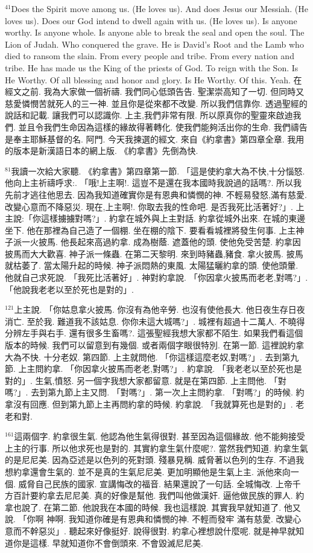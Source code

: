 \documentclass{book}
\begin{document}
$^{41}$Does the Spirit move among us.
(He loves us).
And does Jesus our Messiah.
(He loves us).
Does our God intend to dwell again with us.
(He loves us).
Is anyone worthy.
Is anyone whole.
Is anyone able to break the seal and open the soul.
The Lion of Judah.
Who conquered the grave.
He is David's Root and the Lamb who died to ransom the slain.
From every people and tribe.
From every nation and tribe.
He has made us the King of the priests of God.
To reign with the Son.
Is He Worthy.
Of all blessing and honor and glory.
Is He Worthy.
Of this.
Yeah.
在經文之前.
我為大家做一個祈禱.
我們同心低頭告告.
聖潔崇高知了一切.
但同時又慈愛憐憫苦就死人的三一神.
並且你是從來都不改變.
所以我們信靠你.
透過聖經的說話和記載.
讓我們可以認識你.
上主,我們非常有限.
所以原真你的聖靈來啟迪我們.
並且令我們生命因為這樣的緣故得著轉化.
使我們能夠活出你的生命.
我們禱告是奉主耶穌基督的名.
阿門.
今天我揀選的經文.
來自《約拿書》第四章全章.
我用的版本是新漢語日本的網上版.
《約拿書》先倒為快.

$^{81}$我讀一次給大家聽.
《約拿書》第四章第一節.
「這是使約拿大為不快,十分惱怒.
他向上主祈禱呼求:.
「哦!上主啊!.
這豈不是還在我本國時我說過的話嗎?.
所以我先前才逃往他思去.
因為我知道確實你是有恩典和憐憫的神.
不輕易發怒,滿有慈愛.
改變心意而不降惡災.
現在,上主啊!.
你取去我的性命吧.
是否我死比活著好?」.
上主說:「你這樣擄擄對嗎?」.
約拿在城外與上主對話.
約拿從城外出來.
在城的東邊坐下.
他在那裡為自己造了一個棚.
坐在棚的陰下.
要看看城裡將發生何事.
上主神子派一火披馬.
他長起來高過約拿.
成為樹蔭.
遮蓋他的頭.
使他免受苦楚.
約拿因披馬而大大歡喜.
神子派一條蟲.
在第二天黎明.
來到時豬蟲,豬食.
拿火披馬.
披馬就枯萎了.
當太陽升起的時候.
神子派悶熱的東風.
太陽猛曬約拿的頭.
使他頭暈.
他就自己求死說.
「我死比活著好」.
神對約拿說.
「你因拿火披馬而老老,對嗎?」.
「他說我老老以至於死也是對的」.

$^{121}$上主說.
「你姑息拿火披馬.
你沒有為他辛勞.
也沒有使他長大.
他日夜生存日夜消亡.
至於我.
難道我不該姑息.
你你未這大城嗎?」.
城裡有超過十二萬人.
不曉得分辨左手與右手.
還有很多生畜嗎?.
這張聖經我想大家都不陌生.
如果我們看這個版本的時候.
我們可以留意到有幾個.
或者兩個字眼很特別.
在第一節.
這裡說約拿大為不快.
十分老奴.
第四節.
上主就問他.
「你這樣這麼老奴,對嗎?」.
去到第九節.
上主問約拿.
「你因拿火披馬而老老,對嗎?」.
約拿說.
「我老老以至於死也是對的」.
生氣,憤怒.
另一個字我想大家都留意.
就是在第四節.
上主問他.
「對嗎?」.
去到第九節上主又問.
「對嗎?」.
第一次上主問約拿.
「對嗎?」的時候.
約拿沒有回應.
但到第九節上主再問約拿的時候.
約拿說.
「我就算死也是對的」.
老老和對.

$^{161}$這兩個字.
約拿很生氣.
他認為他生氣得很對.
甚至因為這個緣故.
他不能夠接受上主的行事.
所以他求死也是對的.
其實約拿生氣什麼呢?.
當然我們知道.
約拿生氣的是尼尼美.
因為亞述是以色列的死對頭.
殘暴見稱.
威脅著以色列的生存.
不過我想約拿還會生氣的.
並不是真的生氣尼尼美.
更加明顯他是生氣上主.
派他來向一個.
威脅自己民族的國家.
宣講悔改的福音.
結果還說了一句話.
全城悔改.
上帝千方百計要約拿去尼尼美.
真的好像是幫他.
我們叫他做漢奸.
逼他做民族的罪人.
約拿也說了.
在第二節.
他說我在本國的時候.
我也這樣說.
其實我早就知道了.
他又說.
「你啊 神啊.
我知道你確是有恩典和憐憫的神.
不輕而發牢 滿有慈愛.
改變心意而不幹惡災」.
聽起來好像挺好.
說得很對.
約拿心裡想說什麼呢.
就是神早就知道你是這樣.
早就知道你不會倒頭來.
不會毀滅尼尼美.
\end{document}

